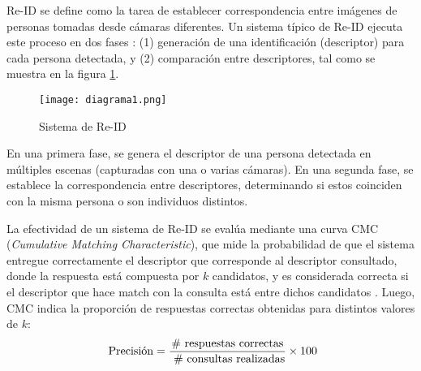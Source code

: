 \documentclass[../memoria.tex]{subfiles}
\begin{document}
\label{fundamentos y discusion bibliografica}

Re-ID se define como la tarea de establecer correspondencia entre imágenes de personas tomadas desde cámaras diferentes. Un sistema típico de Re-ID ejecuta este proceso en dos fases \cite{bedagkar2014survey}: (1) generación de una identificación (descriptor) para cada persona detectada, y (2) comparación entre descriptores, tal como se muestra en la figura \ref{fig:sistemaReID}. 

\begin{figure}[h!]
  \centering
  \texttt{[image: diagrama1.png]}
  \caption{Sistema de Re-ID \cite{bedagkar2014survey}}
  \label{fig:sistemaReID}
\end{figure}

En una primera fase, se genera el descriptor de una persona detectada en múltiples escenas (capturadas con una o varias cámaras). En una segunda fase, se establece la correspondencia entre descriptores, determinando si estos coinciden con la misma persona o son individuos distintos.

La efectividad de un sistema de Re-ID se evalúa mediante una curva CMC (\emph{Cumulative Matching Characteristic}), que mide la probabilidad de que el sistema entregue correctamente el descriptor que corresponde al descriptor consultado, donde la respuesta está compuesta por $k$ candidatos, y es considerada correcta si el descriptor que hace match con la consulta está entre dichos candidatos \cite{decann2012can}. Luego, CMC indica la proporción de respuestas correctas obtenidas para distintos valores de $k$:$${\rm\ Precisi\acute{o}n} = \frac{{\rm \#\ respuestas\ correctas}}{{\rm\ \#\ consultas\ realizadas}}\times 100$$
\end{document}
